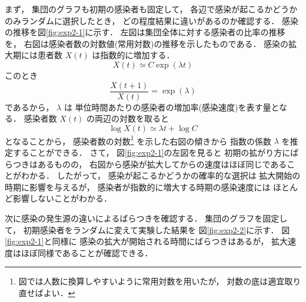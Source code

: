 \documentclass[10pt,oneside]{scrartcl}
\begin{document}
まず，
集団のグラフも初期の感染者も固定して，
各辺で感染が起こるかどうかのみランダムに選択したとき，
どの程度結果に違いがあるのか確認する．
感染の推移を図\ref{fig:exp2-1}に示す．
左図は集団全体に対する感染者の比率の推移を，
右図は感染者数の対数値(常用対数)の推移を示したものである．
感染の拡大期には患者数 \(X(t)\) は指数的に増加する．
\begin{equation}
  X(t)\simeq C\exp(\lambda t)
\end{equation}
このとき
\begin{equation}
  \frac{X(t+1)}{X(t)}
  =\exp(\lambda)
\end{equation}
であるから，
\(\lambda\) は
単位時間あたりの感染者の増加率(感染速度)を表す量となる．
感染者数 \(X(t)\) の両辺の対数を取ると
\begin{equation}
  \log X(t) \simeq \lambda t + \log C
\end{equation}
となることから，
感染者数の対数\footnote{図では人数に換算しやすいように常用対数を用いたが，
対数の底は適宜取り直せばよい．}
を示した右図の傾きから
指数の係数 \(\lambda\) を推定することができる．
さて，
図\ref{fig:exp2-1}の左図を見ると
初期の拡がり方にばらつきはあるものの，
右図から感染が拡大してからの速度はほぼ同じであることがわかる．
したがって，
感染が起こるかどうかの確率的な選択は
拡大開始の時期に影響を与えるが，
感染者が指数的に増大する時期の感染速度には
ほとんど影響しないことがわかる．

\begin{figure*}%
  \centering
\end{figure*}

次に感染の発生源の違いによるばらつきを確認する．
集団のグラフを固定して，
初期感染者をランダムに変えて実験した結果を
図\ref{fig:exp2-2}に示す．
図\ref{fig:exp2-1}と同様に
感染の拡大が開始される時間にばらつきはあるが，
拡大速度はほぼ同様であることが確認できる．

\begin{figure*}%
  \centering
\end{figure*}
\end{document}
